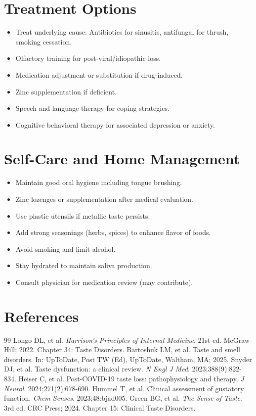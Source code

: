 \section*{Treatment Options}
\begin{itemize}
  \item Treat underlying cause: Antibiotics for sinusitis, antifungal for thrush, smoking cessation.
  \item Olfactory training for post-viral/idiopathic loss.
  \item Medication adjustment or substitution if drug-induced.
  \item Zinc supplementation if deficient.
  \item Speech and language therapy for coping strategies.
  \item Cognitive behavioral therapy for associated depression or anxiety.
\end{itemize}

\section*{Self-Care and Home Management}
\begin{itemize}
  \item Maintain good oral hygiene including tongue brushing.
  \item Zinc lozenges or supplementation after medical evaluation.
  \item Use plastic utensils if metallic taste persists.
  \item Add strong seasonings (herbs, spices) to enhance flavor of foods.
  \item Avoid smoking and limit alcohol.
  \item Stay hydrated to maintain saliva production.
  \item Consult physician for medication review (may contribute).
\end{itemize}

\section*{References}

\begin{thebibliography}{99}
 Longo DL, et al. \emph{Harrison's Principles of Internal Medicine}. 21st ed. McGraw-Hill; 2022. Chapter 34: Taste Disorders.
 Bartoshuk LM, et al. Taste and smell disorders. In: UpToDate, Post TW (Ed), UpToDate, Waltham, MA; 2025.
 Snyder DJ, et al. Taste dysfunction: a clinical review. \emph{N Engl J Med}. 2023;388(9):822-834.
 Heiser C, et al. Post-COVID-19 taste loss: pathophysiology and therapy. \emph{J Neurol}. 2024;271(2):678-690.
 Hummel T, et al. Clinical assessment of gustatory function. \emph{Chem Senses}. 2023;48:bjad005.
 Green BG, et al. \emph{The Sense of Taste}. 3rd ed. CRC Press; 2024. Chapter 15: Clinical Taste Disorders.
\end{thebibliography}
